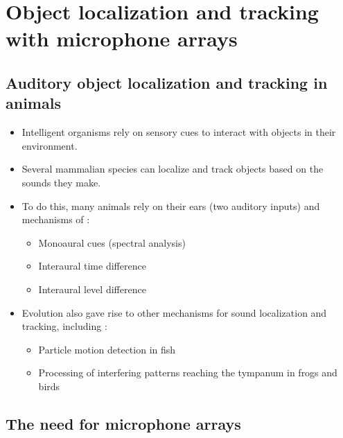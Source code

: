 \documentclass[14pt, legalpaper]{extarticle}
\begin{document}
\section{Object localization and tracking with microphone arrays}

\subsection{Auditory object localization and tracking in animals}

\begin{itemize}

\item Intelligent organisms rely on sensory cues to interact with objects in their environment. 

\item Several mammalian species can localize and track objects based on the sounds they make.

\item To do this, many animals rely on their ears (two auditory inputs) and mechanisms of \cite{grothe2010mechanisms}:
	\begin{itemize}
	\item Monoaural cues (spectral analysis)
	\item Interaural time difference
	\item Interaural level difference
	\end{itemize}

\item Evolution also gave rise to other mechanisms for sound localization and tracking, including \cite{grothe2010mechanisms}: 
	\begin{itemize}
	\item Particle motion detection in fish 
	\item Processing of interfering patterns reaching the tympanum in frogs and birds
	\end{itemize}

\end{itemize}

\subsection{The need for microphone arrays}
\end{document}
